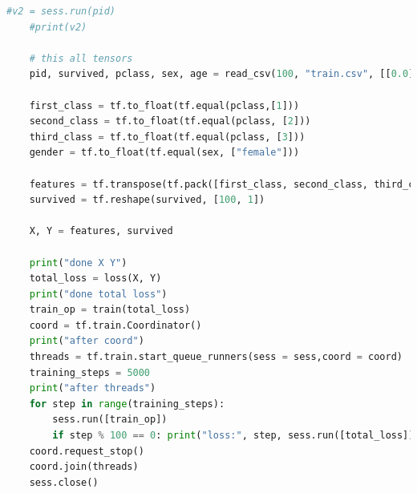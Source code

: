 \documentclass[vecarrow]{svproc}
\begin{document}
\begin{lstlisting}[language=Python,
caption={logistic regression in tensor},label={list8}]
    #v2 = sess.run(pid)
    #print(v2)

	# this all tensors
    pid, survived, pclass, sex, age = read_csv(100, "train.csv", [[0.0], [0.0], [0],[""],[0.0]])

    first_class = tf.to_float(tf.equal(pclass,[1]))
    second_class = tf.to_float(tf.equal(pclass, [2]))
    third_class = tf.to_float(tf.equal(pclass, [3]))
    gender = tf.to_float(tf.equal(sex, ["female"]))

    features = tf.transpose(tf.pack([first_class, second_class, third_class, gender, age]))
    survived = tf.reshape(survived, [100, 1])
    
    X, Y = features, survived
    
    print("done X Y")
    total_loss = loss(X, Y)
    print("done total loss")
    train_op = train(total_loss)
    coord = tf.train.Coordinator()
    print("after coord")
    threads = tf.train.start_queue_runners(sess = sess,coord = coord)
    training_steps = 5000
    print("after threads")
    for step in range(training_steps):
        sess.run([train_op])
        if step % 100 == 0: print("loss:", step, sess.run([total_loss]))
    coord.request_stop()
    coord.join(threads)
    sess.close()
\end{lstlisting}



\end{document}
